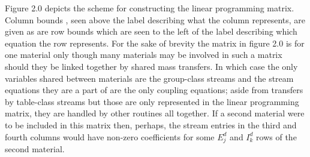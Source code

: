Figure 2.0
depicts the scheme for constructing the linear programming matrix. Column bounds
, seen above the label describing what the column represents, are given as
are row bounds which are seen to the left of the label describing which equation
the row represents. For the sake of brevity
the matrix in figure 2.0 is for one material only though many
materials may be involved in such a matrix should they be linked together
by shared mass transfers. In which case the only variables shared between materials are the
group-class streams and the stream equations they are a part of are the only
coupling equations; aside from transfers by table-class streams but those
are only represented in the linear programming matrix, they are handled by
other routines all together. If a second material were to be included in this
matrix then, perhaps, the stream entries in the third and fourth columns would
have non-zero coefficients for some $E_{j}^{d}$ and $I_{k}^{d}$ rows of the 
second material.

